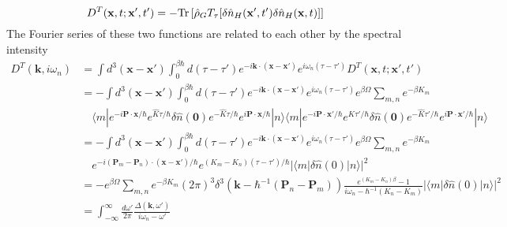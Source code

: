 \begin{equation}
D^T(\mathbf x,t;\mathbf x',t')=-\text{Tr}\left[ \hat \rho_GT_\tau[\delta \hat n_H(\mathbf x',t')\delta\hat n_H(\mathbf x,t)] \right]
\end{equation}
 The Fourier series of these two functions are related to each other by the spectral intensity
\begin{equation}
\begin{aligned}
D^T(\mathbf k,i\omega_n)&=\int d^3(\mathbf x-\mathbf x')\int _0^{\beta\hbar}d(\tau-\tau')e^{-i\mathbf k\cdot(\mathbf x-\mathbf x')}e^{i\omega_n (\tau-\tau')}D^T(\mathbf x,t;\mathbf x',t')\\
&=-\int d^3(\mathbf x-\mathbf x')\int _0^{\beta\hbar}d(\tau-\tau')e^{-i\mathbf k\cdot(\mathbf x-\mathbf x')}e^{i\omega_n (\tau-\tau')} e^{\beta\Omega} \sum_{m,n} e^{-\beta K_m}\\
&\quad\langle m|e^{-i\mathbf P\cdot \mathbf x/\hbar} e^{\hat K \tau/\hbar} \delta \hat n(\mathbf 0) e^{-\hat K \tau/\hbar} e^{i\mathbf P\cdot \mathbf x/\hbar} |n\rangle \langle m|e^{-i\mathbf P\cdot \mathbf x'/\hbar} e^{\hat K \tau'/\hbar} \delta \hat n(\mathbf 0) e^{-\hat K \tau'/\hbar} e^{i\mathbf P\cdot \mathbf x'/\hbar} |n\rangle\\ 
&=-\int d^3(\mathbf x-\mathbf x')\int _0^{\beta\hbar}d(\tau-\tau')e^{-i\mathbf k\cdot(\mathbf x-\mathbf x')}e^{i\omega_n (\tau-\tau')} e^{\beta\Omega} \sum_{m,n}e^{-\beta K_m}\\
&\quad e^{-i(\mathbf P_m-\mathbf P_n)\cdot(\mathbf x-\mathbf x')/\hbar} e^{(K_m-K_n)(\tau-\tau')/\hbar} |\langle m|\delta\hat n(0)|n\rangle|^2\\
&=-e^{\beta\Omega} \sum_{m,n} e^{-\beta K_m} (2\pi)^3 \delta^3(\mathbf k-\hbar^{-1}(\mathbf P_n-\mathbf P_m))\frac{e^{(K_m-K_n)\beta}-1}{i\omega_n-\hbar^{-1}(K_n-K_m)}|\langle m|\delta \hat n(0)|n\rangle|^2\\
&=\int_{-\infty}^{\infty}\frac{d\omega'}{2\pi}\frac{\Delta(\mathbf k,\omega')}{i\omega_n-\omega'}
\end{aligned}
\end{equation}

